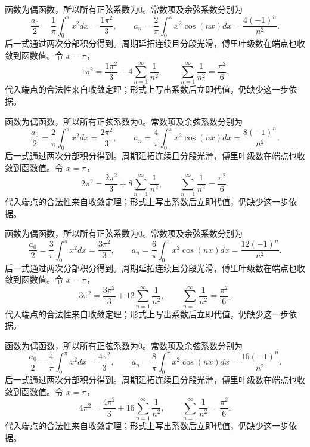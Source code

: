 \documentclass[UTF8,12pt,a4paper,fontset=fandol]{ctexart}
\begin{document}
\begin{solve}\label{ans:c28q19}
函数为偶函数，所以所有正弦系数为0。常数项及余弦系数分别为
\[
\frac{a_0}2=\frac{1}\pi\int_0^\pi x^2dx=\frac{1\pi^2}3,\qquad a_n=\frac{2}\pi\int_0^\pi x^2\cos(nx)dx=\frac{4(-1)^n}{n^2}.
\]
后一式通过两次分部积分得到。周期延拓连续且分段光滑，傅里叶级数在端点也收敛到函数值。令 $x=\pi$，
\[
1\pi^2=\frac{1\pi^2}3+4\sum_{n=1}^\infty\frac1{n^2},\qquad\sum_{n=1}^\infty\frac1{n^2}=\frac{\pi^2}6.
\]
代入端点的合法性来自收敛定理；形式上写出系数后立即代值，仍缺少这一步依据。
\end{solve}

\begin{solve}\label{ans:c28q20}
函数为偶函数，所以所有正弦系数为0。常数项及余弦系数分别为
\[
\frac{a_0}2=\frac{2}\pi\int_0^\pi x^2dx=\frac{2\pi^2}3,\qquad a_n=\frac{4}\pi\int_0^\pi x^2\cos(nx)dx=\frac{8(-1)^n}{n^2}.
\]
后一式通过两次分部积分得到。周期延拓连续且分段光滑，傅里叶级数在端点也收敛到函数值。令 $x=\pi$，
\[
2\pi^2=\frac{2\pi^2}3+8\sum_{n=1}^\infty\frac1{n^2},\qquad\sum_{n=1}^\infty\frac1{n^2}=\frac{\pi^2}6.
\]
代入端点的合法性来自收敛定理；形式上写出系数后立即代值，仍缺少这一步依据。
\end{solve}

\begin{solve}\label{ans:c28q21}
函数为偶函数，所以所有正弦系数为0。常数项及余弦系数分别为
\[
\frac{a_0}2=\frac{3}\pi\int_0^\pi x^2dx=\frac{3\pi^2}3,\qquad a_n=\frac{6}\pi\int_0^\pi x^2\cos(nx)dx=\frac{12(-1)^n}{n^2}.
\]
后一式通过两次分部积分得到。周期延拓连续且分段光滑，傅里叶级数在端点也收敛到函数值。令 $x=\pi$，
\[
3\pi^2=\frac{3\pi^2}3+12\sum_{n=1}^\infty\frac1{n^2},\qquad\sum_{n=1}^\infty\frac1{n^2}=\frac{\pi^2}6.
\]
代入端点的合法性来自收敛定理；形式上写出系数后立即代值，仍缺少这一步依据。
\end{solve}

\begin{solve}\label{ans:c28q22}
函数为偶函数，所以所有正弦系数为0。常数项及余弦系数分别为
\[
\frac{a_0}2=\frac{4}\pi\int_0^\pi x^2dx=\frac{4\pi^2}3,\qquad a_n=\frac{8}\pi\int_0^\pi x^2\cos(nx)dx=\frac{16(-1)^n}{n^2}.
\]
后一式通过两次分部积分得到。周期延拓连续且分段光滑，傅里叶级数在端点也收敛到函数值。令 $x=\pi$，
\[
4\pi^2=\frac{4\pi^2}3+16\sum_{n=1}^\infty\frac1{n^2},\qquad\sum_{n=1}^\infty\frac1{n^2}=\frac{\pi^2}6.
\]
代入端点的合法性来自收敛定理；形式上写出系数后立即代值，仍缺少这一步依据。
\end{solve}
\end{document}
